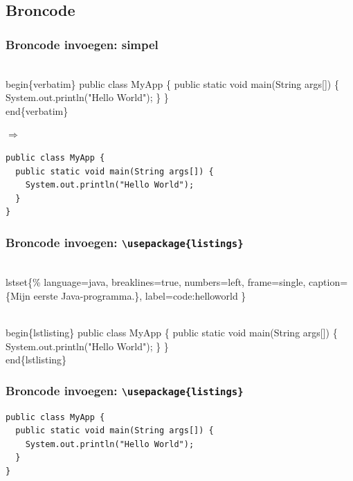 \documentclass{beamer}
\begin{document}
\subsection{Broncode}

\begin{frame}[fragile]
  \frametitle{Broncode invoegen: simpel}

\begin{semiverbatim}
\alert{\\begin\{verbatim\}}
public class MyApp \{
  public static void main(String args[]) \{
    System.out.println("Hello World");
  \}
\}
\alert{\\end\{verbatim\}}
\end{semiverbatim}
$\Rightarrow$
\begin{verbatim}
public class MyApp {
  public static void main(String args[]) {
    System.out.println("Hello World");
  }
}
\end{verbatim}  

\end{frame}

\begin{frame}[fragile]
  \frametitle{Broncode invoegen: \texttt{\textbackslash{}usepackage\{listings\}}}

\begin{semiverbatim}
\\lstset\{\%
  language=java,    breaklines=true,
  numbers=left,     frame=single,
  caption=\{Mijn eerste Java-programma.\},
  label=code:helloworld
\}

\alert{\\begin\{lstlisting\}}
public class MyApp \{
  public static void main(String args[]) \{
    System.out.println("Hello World");
  \}
\}
\alert{\\end\{lstlisting\}}
\end{semiverbatim}

\end{frame}

\begin{frame}[fragile]
  \frametitle{Broncode invoegen:  \texttt{\textbackslash{}usepackage\{listings\}}}


\begin{lstlisting}
public class MyApp {
  public static void main(String args[]) {
    System.out.println("Hello World");
  }
}
\end{lstlisting}

\end{frame}
\end{document}
